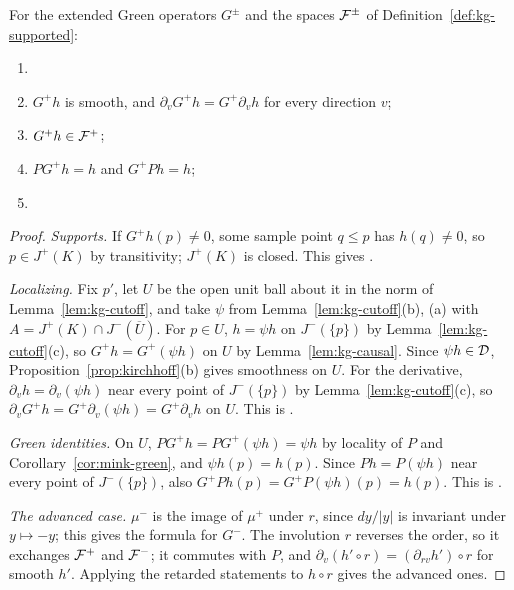 \begin{proposition}[$G^\pm$ on $\cF^\pm$]\label{prop:kg-ext}
For the extended Green operators $G^\pm$ and the spaces $\cF^\pm$ of Definition~\ref{def:kg-supported}:
\begin{enumerate}[label=(\alph*),leftmargin=2.5em]
\item {}
\item {} $G^+h$ is smooth, and $\partial_vG^+h=G^+\partial_vh$ for every direction $v$;
\item {} $G^+h\in\mathcal F^+$;
\item {} $PG^+h=h$ and $G^+Ph=h$;
\item {}
\end{enumerate}
\end{proposition}
\begin{proof}
\emph{Supports.} If $G^+h(p)\ne0$, some sample point $q\le p$ has $h(q)\ne0$, so $p\in J^+(K)$ by
transitivity; $J^+(K)$ is closed. This gives .

\emph{Localizing.} Fix $p'$, let $U$ be the open unit ball about it in the norm of
Lemma~\ref{lem:kg-cutoff}, and take $\psi$ from Lemma~\ref{lem:kg-cutoff}(b), (a) with
$A=J^+(K)\cap J^-(\overline U)$. For $p\in U$, $h=\psi h$ on $J^-(\{p\})$ by
Lemma~\ref{lem:kg-cutoff}(c), so $G^+h=G^+(\psi h)$ on $U$ by Lemma~\ref{lem:kg-causal}. Since $\psi h\in\mathcal D$,
Proposition~\ref{prop:kirchhoff}(b) gives smoothness on $U$. For the derivative,
$\partial_vh=\partial_v(\psi h)$ near every point of $J^-(\{p\})$ by Lemma~\ref{lem:kg-cutoff}(c),
so $\partial_vG^+h=G^+\partial_v(\psi h)=G^+\partial_vh$ on $U$. This is .

\emph{Green identities.} On $U$, $PG^+h=PG^+(\psi h)=\psi h$ by locality of $P$ and
Corollary~\ref{cor:mink-green}, and $\psi h(p)=h(p)$. Since $Ph=P(\psi h)$ near every point of
$J^-(\{p\})$, also $G^+Ph(p)=G^+P(\psi h)(p)=h(p)$. This is .

\emph{The advanced case.} $\mu^-$ is the image of $\mu^+$ under $r$, since $dy/|y|$ is invariant
under $y\mapsto-y$; this gives the formula for $G^-$. The involution $r$ reverses the order, so it
exchanges $\mathcal F^+$ and $\mathcal F^-$; it commutes with $P$, and
$\partial_v(h'\circ r)=(\partial_{rv}h')\circ r$ for smooth $h'$. Applying the retarded statements to
$h\circ r$ gives the advanced ones.
\end{proof}

